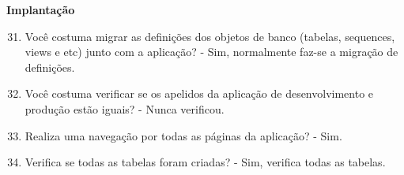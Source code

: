 \begin{anexosenv}
\textbf{Implantação}

\begin{enumerate}
\setcounter{enumi}{30}
\item Você costuma migrar as definições dos objetos de banco (tabelas, sequences, views e
etc) junto com a aplicação?\newline
- Sim, normalmente faz-se a migração de definições.
\item Você costuma verificar se os apelidos da aplicação de desenvolvimento e produção
estão iguais?\newline
- Nunca verificou.
\item Realiza uma navegação por todas as páginas da aplicação?\newline
- Sim.
\item Verifica se todas as tabelas foram criadas?\newline
- Sim, verifica todas as tabelas.
\end{enumerate}


\end{anexosenv}

